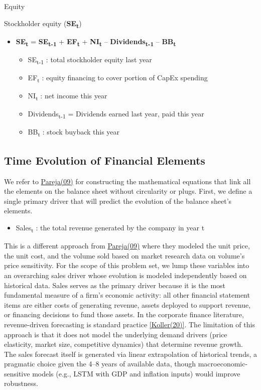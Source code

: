 \documentclass[12pt,a4paper]{article}
\begin{document}
Equity

Stockholder equity (\textbf{SE\textsubscript{t}})

\begin{itemize}
\item
  \textbf{SE\textsubscript{t}} = \textbf{SE\textsubscript{t-1}} +
  \textbf{EF\textsubscript{t}} + \textbf{NI\textsubscript{t}} --
  \textbf{Dividends\textsubscript{t-1}} -- \textbf{BB\textsubscript{t}}

  \begin{itemize}
  \item
    SE\textsubscript{t-1} : total stockholder equity last year
  \item
    EF\textsubscript{t} : equity financing to cover portion of CapEx
    spending
  \item
    NI\textsubscript{t} : net income this year
  \item
    Dividends\textsubscript{t-1} = Dividends earned last year, paid this
    year
  \item
    BB\textsubscript{t} : stock buyback this year
  \end{itemize}
\end{itemize}

\subsection{Time Evolution of Financial Elements}

We refer to \hyperlink{ref:pareja09}{Pareja(09)} for constructing the mathematical equations that
link all the elements on the balance sheet without circularity or plugs.
First, we define a single primary driver that will predict the evolution
of the balance sheet's elements.

\begin{itemize}
\item
  Sales\textsubscript{t} : the total revenue generated by the company in
  year t
\end{itemize}

This is a different approach from \hyperlink{ref:pareja09}{Pareja(09)} where they modeled the unit
price, the unit cost, and the volume sold based on market research data
on volume's price sensitivity. For the scope of this problem set, we
lump these variables into an overarching sales driver whose evolution is
modeled independently based on historical data. Sales serves as the primary driver because it is the most fundamental measure of a firm's economic activity: all other financial statement items are either costs of generating revenue, assets deployed to support revenue, or financing decisions to fund those assets. In the corporate finance literature, revenue-driven forecasting is standard practice \hyperlink{ref:koller20}{[Koller(20)]}. The limitation of this approach is that it does not model the underlying demand drivers (price elasticity, market size, competitive dynamics) that determine revenue growth. The sales forecast itself is generated via linear extrapolation of historical trends, a pragmatic choice given the 4--8 years of available data, though macroeconomic-sensitive models (e.g., LSTM with GDP and inflation inputs) would improve robustness.
\end{document}
